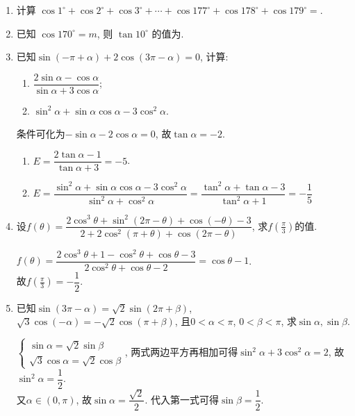 \begin{enumerate}
\item 计算 $\cos 1^{\circ}+\cos 2^{\circ}+\cos 3^{\circ}+\cdots+\cos 177^{\circ}+\cos 178^{\circ}+\cos 179^{\circ}=$.

\item 已知 $\cos 170^{\circ}=m$, 则 $\tan 10^{\circ}$ 的值为.


\item 已知$\sin\left(-\pi+\alpha\right)+2\cos\left(3\pi-\alpha\right)=0$, 计算: 
\begin{enumerate}[(1)]
\item $\dfrac{2\sin\alpha-\cos\alpha}{\sin\alpha+3\cos\alpha}$; 
\item $\sin^2\alpha+\sin\alpha\cos\alpha-3\cos^2\alpha$. 
\end{enumerate}
\begin{jieda}
条件可化为$-\sin\alpha-2\cos\alpha=0$, 故$\tan\alpha=-2$. 
\begin{enumerate}[(1)]
\item $E=\dfrac{2\tan\alpha-1}{\tan\alpha+3}=-5$. 
\item $E=\dfrac{\sin^2\alpha+\sin\alpha\cos\alpha-3\cos^2\alpha}{\sin^2\alpha+\cos^2\alpha}=\dfrac{\tan^2\alpha+\tan\alpha-3}{\tan^2\alpha+1}=-\dfrac{1}{5}$
\end{enumerate}
\end{jieda}


\item 设$f\left(\theta\right)=\dfrac{2\cos^3\theta+\sin^2\left(2\pi-\theta\right)+\cos\left(-\theta\right)-3}{2+2\cos^2\left(\pi+\theta\right)+\cos\left(2\pi-\theta\right)}$, 求$f\left(\frac{\pi}{3}\right)$的值. 
\begin{jieda}
$f\left(\theta\right)=\dfrac{2\cos^3\theta+1-\cos^2\theta+\cos\theta-3}{2\cos^2\theta+\cos\theta-2}=\cos\theta-1$. \\
故$f\left(\frac{\pi}{3}\right)=-\dfrac{1}{2}$. 
\end{jieda}


\item 已知$\sin\left(3\pi-\alpha\right)=\sqrt2\sin\left(2\pi+\beta\right)$, $\sqrt3\cos\left(-\alpha\right)=-\sqrt2\cos\left(\pi+\beta\right)$, 
且$0<\alpha<\pi$, $0<\beta<\pi$, 求$\sin\alpha,\sin\beta$. 
\begin{jieda}
$\begin{cases}
\sin\alpha=\sqrt{2}\sin\beta\\
\sqrt{3}\cos\alpha=\sqrt{2}\cos\beta
\end{cases}$, 两式两边平方再相加可得$\sin^2\alpha+3\cos^2\alpha=2$, 故$\sin^2\alpha=\dfrac{1}{2}$. \\
又$\alpha\in\left(0,\pi\right)$, 故$\sin\alpha=\dfrac{\sqrt{2}}{2}$. 
代入第一式可得$\sin\beta=\dfrac{1}{2}$. 
\end{jieda}


\end{enumerate}

